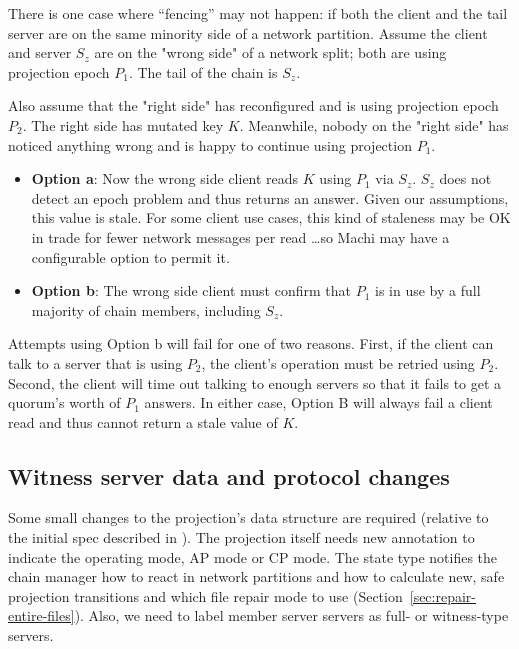 \documentclass[preprint,10pt]{sigplanconf}
\begin{document}
There is one case where ``fencing'' may not happen: if both the client
and the tail server are on the same minority side of a network partition.
Assume the client and server $S_z$ are on the "wrong side" of a network
split; both are using projection epoch $P_1$.  The tail of the
chain is $S_z$.

Also assume that the "right side" has reconfigured and is using
projection epoch $P_2$.  The right side has mutated key $K$.  Meanwhile,
nobody on the "right side" has noticed anything wrong and is happy to
continue using projection $P_1$.

\begin{itemize}
\item {\bf Option a}: Now the wrong side client reads $K$ using $P_1$ via
  $S_z$.  $S_z$ does not detect an epoch problem and thus returns an
  answer.  Given our assumptions, this value is stale.  For some
  client use cases, this kind of staleness may be OK in trade for
  fewer network messages per read \ldots so Machi may
  have a configurable option to permit it.
\item {\bf Option b}: The wrong side client must confirm that $P_1$ is
  in use by a full majority of chain members, including $S_z$.
\end{itemize}

Attempts using Option b will fail for one of two reasons.  First, if
the client can talk to a server that is using $P_2$, the client's
operation must be retried using $P_2$.  Second, the client will time
out talking to enough servers so that it fails to get a quorum's worth of
$P_1$ answers.  In either case, Option B will always fail a client
read and thus cannot return a stale value of $K$.

\subsection{Witness server data and protocol changes}

Some small changes to the projection's data structure
are required (relative to the initial spec described in
\cite{machi-design}).  The projection itself
needs new annotation to indicate the operating mode, AP mode or CP
mode.  The state type notifies the chain manager how to
react in network partitions and how to calculate new, safe projection
transitions and which file repair mode to use
(Section~\ref{sec:repair-entire-files}).
Also, we need to label member server servers as full- or
witness-type servers.
\end{document}
